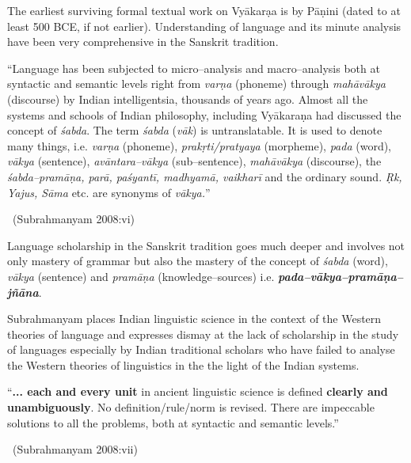 The earliest surviving formal textual work on Vyākarạa is by Pāṇini (dated to at least 500 BCE, if not earlier). Understanding of language and its minute analysis have been very comprehensive in the Sanskrit tradition.

\begin{myquote}
“Language has been subjected to micro–analysis and macro–analysis both at syntactic and semantic levels right from \textit{varṇa} (phoneme) through \textit{mahāvākya} (discourse) by Indian intelligentsia, thousands of years ago. Almost all the systems and schools of Indian philosophy, including Vyākaraṇa had discussed the concept of \textit{śabda}. The term \textit{śabda} (\textit{vāk}) is untranslatable. It is used to denote many things, i.e. \textit{varṇa} (phoneme), \textit{prakṛti/pratyaya} (morpheme), \textit{pada} (word), \textit{vākya} (sentence), \textit{avāntara–vākya} (sub–sentence), \textit{mahāvākya} (discourse), the \textit{śabda–pramāṇa, parā, paśyantī, madhyamā, vaikharī} and the ordinary sound. \textit{Ṛk, Yajus, Sāma} etc. are synonyms of \textit{vākya.}”

~\hfill (Subrahmanyam 2008:vi)
\end{myquote}

Language scholarship in the Sanskrit tradition goes much deeper and involves not only mastery of grammar but also the mastery of the concept of \textit{śabda} (word), \textit{vākya} (sentence) and \textit{pramāṇa} (knowledge–sources) i.e. \textbf{\textit{pada–vākya–pramāṇa–jñāna}}.

Subrahmanyam places Indian linguistic science in the context of the Western theories of language and expresses dismay at the lack of scholarship in the study of languages especially by Indian traditional scholars who have failed to analyse the Western theories of linguistics in the the light of the Indian systems.

\begin{myquote}
“\textbf{... each and every unit} in ancient linguistic science is defined \textbf{clearly and unambiguously}. No definition/rule/norm is revised. There are impeccable solutions to all the problems, both at syntactic and semantic levels.”

~\hfill (Subrahmanyam 2008:vii)
\end{myquote}

